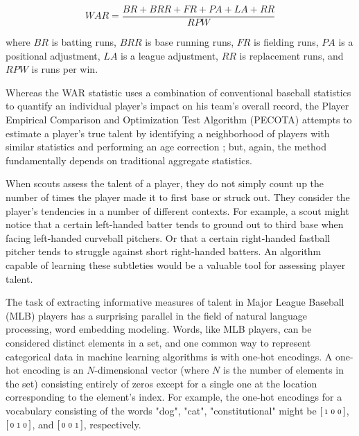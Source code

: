 \documentclass{article}
\begin{document}
\begin{equation}
\label{eqn:war}
WAR = \frac{BR + BRR + FR + PA + LA + RR}{RPW}
\end{equation}

where $BR$ is batting runs, $BRR$ is base running runs, $FR$ is fielding runs, $PA$ is a positional adjustment, $LA$ is a league adjustment, $RR$ is replacement runs, and $RPW$ is runs per win.

Whereas the WAR statistic uses a combination of conventional baseball statistics to quantify an individual player's impact on his team's overall record, the Player Empirical Comparison and Optimization Test Algorithm (PECOTA) attempts to estimate a player's true talent by identifying a neighborhood of players with similar statistics and performing an age correction \parencite{PECOTA}; but, again, the method fundamentally depends on traditional aggregate statistics.

When scouts assess the talent of a player, they do not simply count up the number of times the player made it to first base or struck out. They consider the player's tendencies in a number of different contexts. For example, a scout might notice that a certain left-handed batter tends to ground out to third base when facing left-handed curveball pitchers. Or that a certain right-handed fastball pitcher tends to struggle against short right-handed batters. An algorithm capable of learning these subtleties would be a valuable tool for assessing player talent.

The task of extracting informative measures of talent in Major League Baseball (MLB) players has a surprising parallel in the field of natural language processing, word embedding modeling. Words, like MLB players, can be considered distinct elements in a set, and one common way to represent categorical data in machine learning algorithms is with one-hot encodings. A one-hot encoding is an $N$-dimensional vector (where $N$ is the number of elements in the set) consisting entirely of zeros except for a single one at the location corresponding to the element's index. For example, the one-hot encodings for a vocabulary consisting of the words {"dog", "cat", "constitutional"} might be $\begin{bsmallmatrix} 1 & 0 & 0 \end{bsmallmatrix}$, $\begin{bsmallmatrix} 0 & 1 & 0 \end{bsmallmatrix}$, and $\begin{bsmallmatrix} 0 & 0 & 1 \end{bsmallmatrix}$, respectively.
\end{document}
